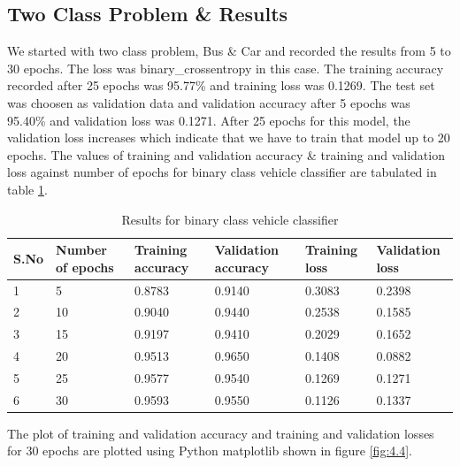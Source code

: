 \subsection{Two Class Problem \& Results}
We started with two class problem, Bus \& Car and recorded the results from 5
to 30 epochs.
The loss was binary\_crossentropy in this case. 
The training accuracy recorded after 25 epochs was 95.77\% and training
loss was 0.1269. The test set was choosen as validation data and validation accuracy after 5 epochs 
was 95.40\% and validation loss was 0.1271.
After 25 epochs for this model, the validation loss increases which indicate
that we have to train that model up to 20 epochs. The values of training
and validation accuracy \& training and validation loss
against number of epochs for binary class vehicle classifier
are tabulated in table \ref{table:4.1}.
\begin{table}[H]
    \caption{Results for binary class vehicle classifier}
    \label{table:4.1}
	  \begin{center}
		\scalebox{0.85}
		{\begin{tabular}{|l |l |l |l |l |l |}
		\hline
		S.No & Number of epochs & Training accuracy & Validation accuracy & Training loss & Validation loss\\ \hline
		1  & 5 & 0.8783 & 0.9140 & 0.3083 & 0.2398
		\\ \hline
		2  & 10 & 0.9040 & 0.9440 & 0.2538 & 0.1585 
		\\ \hline
		3   & 15 & 0.9197  &  0.9410 & 0.2029 & 0.1652
        \\ \hline %
        4   & 20 &  0.9513 & 0.9650  &0.1408  & 0.0882
        \\ \hline %
        5   & 25 &  0.9577 & 0.9540  &0.1269  & 0.1271
        \\ \hline %
        6   & 30 &  0.9593 & 0.9550  &0.1126  & 0.1337
		\\ \hline %
		\end{tabular}}
	  \end{center}
\end{table}
\noindent The plot of training and validation accuracy and training and validation
losses for 30 epochs are plotted using Python matplotlib shown in figure \ref{fig:4.4}.
